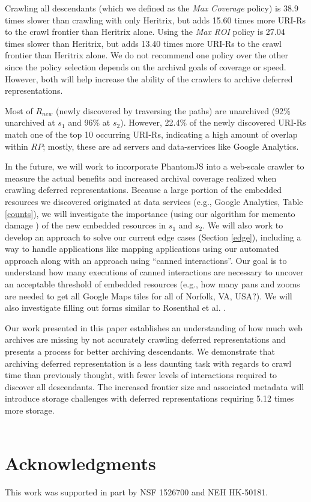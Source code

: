 \documentclass{sig-alternate}
\begin{document}
Crawling all descendants (which we defined as the \emph{Max Coverage} policy) is 38.9 times slower than crawling with only Heritrix, but adds 15.60 times more URI-Rs to the crawl frontier than Heritrix alone. Using the \emph{Max ROI} policy is 27.04 times slower than Heritrix, but adds 13.40 times more URI-Rs to the crawl frontier than Heritrix alone. 
We do not recommend one policy over the other since the policy selection depends on the archival goals of coverage or speed. However, both will help increase the ability of the crawlers to archive deferred representations. 

Most of $R_{new}$ (newly discovered by traversing the paths) are unarchived (92\% unarchived at $s_1$ and 96\% at $s_2$). However, 22.4\% of the newly discovered URI-Rs match one of the top 10 occurring URI-Rs, indicating a high amount of overlap within $RP$; mostly, these are ad servers and data-services like Google Analytics. 

In the future, we will work to incorporate PhantomJS into a web-scale crawler to measure the actual benefits and increased archival coverage realized when crawling deferred representations. Because a large portion of the embedded resources we discovered originated at data services (e.g., Google Analytics, Table \ref{counts}), we will investigate the importance (using our algorithm for memento damage \cite{brunelleDamage, damageIJDL}) of the new embedded resources in $s_1$ and $s_2$. We will also work to develop an approach to solve our current edge cases (Section \ref{edge}), including a way to handle applications like mapping applications using our automated approach along with an approach using ``canned interactions''. Our goal is to understand how many executions of canned interactions are necessary to uncover an acceptable threshold of embedded resources (e.g., how many pans and zooms are needed to get all Google Maps tiles for all of Norfolk, VA, USA?). We will also investigate filling out forms similar to Rosenthal et al. \cite{dshrDlib}.

Our work presented in this paper establishes an understanding of how much web archives are missing by not accurately crawling deferred representations and presents a process for better archiving descendants. We demonstrate that archiving deferred representation is a less daunting task with regards to crawl time than previously thought, with fewer levels of interactions required to discover all descendants. The increased frontier size and associated metadata will introduce storage challenges with deferred representations requiring 5.12 times more storage.
\\\\
\section{Acknowledgments}
This work was supported in part by NSF 1526700 and NEH HK-50181.



  
\end{document}
